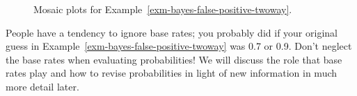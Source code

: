 \documentclass[
  letterpaper,
  DIV=11,
  numbers=noendperiod]{scrreprt}
\theoremstyle{plain}
\theoremstyle{definition}
\theoremstyle{definition}
\theoremstyle{definition}
\theoremstyle{remark}
\begin{document}
\begin{figure}

\begin{minipage}{0.50\linewidth}



\end{minipage}%
%
\begin{minipage}{0.50\linewidth}



\end{minipage}%

\caption{\label{fig-DS-mosaic-twoway}Mosaic plots for
Example~\ref{exm-bayes-false-positive-twoway}.}

\end{figure}%

People have a tendency to ignore base rates; you probably did if your
original guess in Example~\ref{exm-bayes-false-positive-twoway} was 0.7
or 0.9. Don't neglect the base rates when evaluating probabilities! We
will discuss the role that base rates play and how to revise
probabilities in light of new information in much more detail later.
\end{document}
